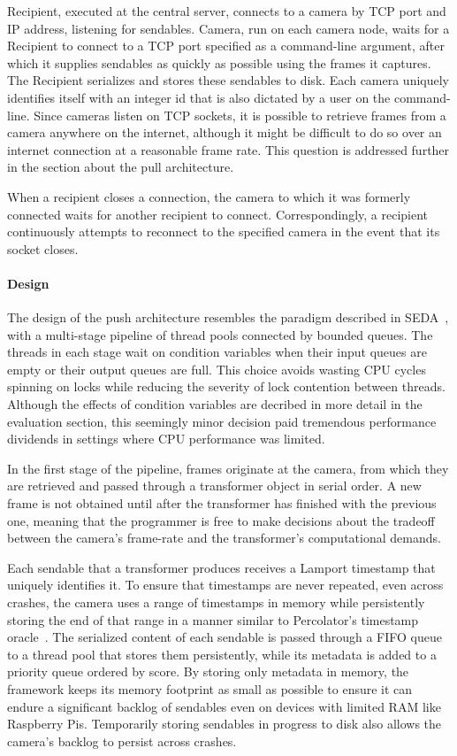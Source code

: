 Recipient, executed at the
central server, connects to a camera by TCP port and IP address, listening
for sendables.  Camera, run on each camera node, waits for a Recipient to
connect to a TCP port specified as a command-line argument, after which it
supplies sendables as quickly as possible using the frames it captures.  The
Recipient serializes and stores these sendables to disk.  Each camera uniquely
identifies itself with an integer id that is also dictated by a user on the command-line.
Since cameras listen on TCP sockets, it is possible to retrieve frames from a camera
anywhere on the internet, although it might be difficult to do so over an internet
connection at a reasonable frame rate.  This question is addressed further in the
section about the pull architecture.

When a recipient closes a connection, the camera to which it was formerly connected
waits for another recipient to connect.  Correspondingly, a recipient continuously
attempts to reconnect to the specified camera in the event that its socket closes.


\paragraph{Design}

The design of the push architecture resembles the paradigm described in
SEDA~\cite{seda}, with a multi-stage pipeline of thread pools connected
by bounded queues. The threads in each stage wait on condition variables
when their input queues are empty or their output queues are full.  This
choice avoids wasting CPU cycles spinning on locks while reducing the severity
of lock contention between threads.  Although the effects of condition variables
are decribed in more detail in the evaluation section, this seemingly minor
decision paid tremendous performance dividends in settings where CPU
performance was limited.

In the first stage of the pipeline, frames originate at the camera, from which they
are retrieved and passed through a transformer object in serial order.  A
new frame is not obtained until after the transformer has finished with the
previous one, meaning that the programmer is free to make decisions about
the tradeoff between the camera's frame-rate and the transformer's
computational demands.

Each sendable that a transformer produces receives
a Lamport timestamp that uniquely identifies it.  To ensure that timestamps are
never repeated, even across crashes, the camera uses a range of timestamps in memory while
persistently storing the end of that range in a manner similar to Percolator's
timestamp oracle~\cite{percolator}.  The serialized content of each sendable
is passed through a FIFO queue to a thread pool that stores them persistently,
while its metadata is added to a priority queue ordered by score.  By storing only
metadata in memory, the framework keeps its memory footprint as small as possible to ensure it can
endure a significant backlog of sendables even on devices with limited RAM
like Raspberry Pis.  Temporarily storing sendables in progress to disk also allows the
camera's backlog to persist across crashes.

